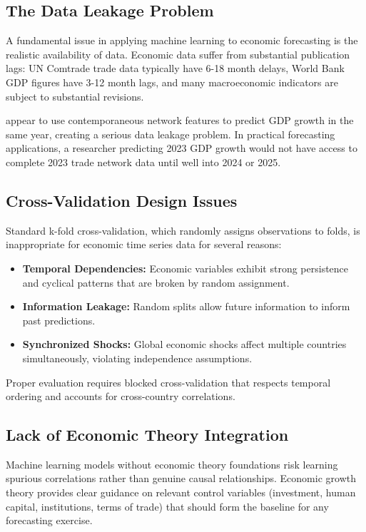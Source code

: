 \documentclass[11pt,a4paper]{article}
\begin{document}
\subsection{The Data Leakage Problem}

A fundamental issue in applying machine learning to economic forecasting is the realistic availability of data. Economic data suffer from substantial publication lags: UN Comtrade trade data typically have 6-18 month delays, World Bank GDP figures have 3-12 month lags, and many macroeconomic indicators are subject to substantial revisions.

\citet{silva2024machine} appear to use contemporaneous network features to predict GDP growth in the same year, creating a serious data leakage problem. In practical forecasting applications, a researcher predicting 2023 GDP growth would not have access to complete 2023 trade network data until well into 2024 or 2025.

\subsection{Cross-Validation Design Issues}

Standard k-fold cross-validation, which randomly assigns observations to folds, is inappropriate for economic time series data for several reasons:

\begin{itemize}
\item \textbf{Temporal Dependencies:} Economic variables exhibit strong persistence and cyclical patterns that are broken by random assignment.
\item \textbf{Information Leakage:} Random splits allow future information to inform past predictions.
\item \textbf{Synchronized Shocks:} Global economic shocks affect multiple countries simultaneously, violating independence assumptions.
\end{itemize}

Proper evaluation requires blocked cross-validation that respects temporal ordering and accounts for cross-country correlations.

\subsection{Lack of Economic Theory Integration}

Machine learning models without economic theory foundations risk learning spurious correlations rather than genuine causal relationships. Economic growth theory provides clear guidance on relevant control variables (investment, human capital, institutions, terms of trade) that should form the baseline for any forecasting exercise.
\end{document}
